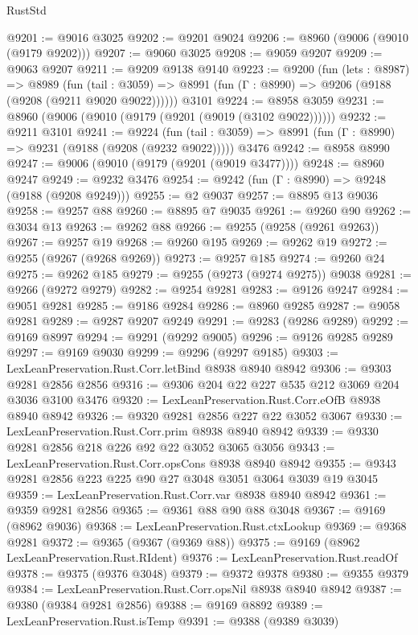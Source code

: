 \begin{lexlean}{RustStd}
\begin{coremodule}
@9201 := @9016 @3025
@9202 := @9201 @9024
@9206 := @8960 (@9006 (@9010 (@9179 @9202)))
@9207 := @9060 @3025
@9208 := @9059 @9207
@9209 := @9063 @9207
@9211 := @9209 @9138 @9140
@9223 := @9200
    (fun (lets : @8987) =>
    @8989
      (fun (tail : @3059) => @8991 (fun (Γ : @8990) => @9206 (@9188 (@9208 (@9211 @9020 @9022))))))
    @3101
@9224 := @8958 @3059
@9231 := @8960 (@9006 (@9010 (@9179 (@9201 (@9019 (@3102 @9022))))))
@9232 := @9211 @3101
@9241 := @9224
    (fun (tail : @3059) => @8991 (fun (Γ : @8990) => @9231 (@9188 (@9208 (@9232 @9022)))))
    @3476
@9242 := @8958 @8990
@9247 := @9006 (@9010 (@9179 (@9201 (@9019 @3477))))
@9248 := @8960 @9247
@9249 := @9232 @3476
@9254 := @9242 (fun (Γ : @8990) => @9248 (@9188 (@9208 @9249)))
@9255 := @2 @9037
@9257 := @8895 @13 @9036
@9258 := @9257 @88
@9260 := @8895 @7 @9035
@9261 := @9260 @90
@9262 := @3034 @13
@9263 := @9262 @88
@9266 := @9255 (@9258 (@9261 @9263))
@9267 := @9257 @19
@9268 := @9260 @195
@9269 := @9262 @19
@9272 := @9255 (@9267 (@9268 @9269))
@9273 := @9257 @185
@9274 := @9260 @24
@9275 := @9262 @185
@9279 := @9255 (@9273 (@9274 @9275)) @9038
@9281 := @9266 (@9272 @9279)
@9282 := @9254 @9281
@9283 := @9126 @9247
@9284 := @9051 @9281
@9285 := @9186 @9284
@9286 := @8960 @9285
@9287 := @9058 @9281
@9289 := @9287 @9207 @9249
@9291 := @9283 (@9286 @9289)
@9292 := @9169 @8997
@9294 := @9291 (@9292 @9005)
@9296 := @9126 @9285 @9289
@9297 := @9169 @9030
@9299 := @9296 (@9297 @9185)
@9303 := LexLeanPreservation.Rust.Corr.letBind @8938 @8940 @8942
@9306 := @9303 @9281 @2856 @2856
@9316 := @9306 @204 @22 @227 @535 @212 @3069 @204 @3036 @3100 @3476
@9320 := LexLeanPreservation.Rust.Corr.eOfB @8938 @8940 @8942
@9326 := @9320 @9281 @2856 @227 @22 @3052 @3067
@9330 := LexLeanPreservation.Rust.Corr.prim @8938 @8940 @8942
@9339 := @9330 @9281 @2856 @218 @226 @92 @22 @3052 @3065 @3056
@9343 := LexLeanPreservation.Rust.Corr.opsCons @8938 @8940 @8942
@9355 := @9343 @9281 @2856 @223 @225 @90 @27 @3048 @3051 @3064 @3039 @19 @3045
@9359 := LexLeanPreservation.Rust.Corr.var @8938 @8940 @8942
@9361 := @9359 @9281 @2856
@9365 := @9361 @88 @90 @88 @3048
@9367 := @9169 (@8962 @9036)
@9368 := LexLeanPreservation.Rust.ctxLookup
@9369 := @9368 @9281
@9372 := @9365 (@9367 (@9369 @88))
@9375 := @9169 (@8962 LexLeanPreservation.Rust.RIdent)
@9376 := LexLeanPreservation.Rust.readOf
@9378 := @9375 (@9376 @3048)
@9379 := @9372 @9378
@9380 := @9355 @9379
@9384 := LexLeanPreservation.Rust.Corr.opsNil @8938 @8940 @8942
@9387 := @9380 (@9384 @9281 @2856)
@9388 := @9169 @8892
@9389 := LexLeanPreservation.Rust.isTemp
@9391 := @9388 (@9389 @3039)

\end{coremodule}
\end{lexlean}
